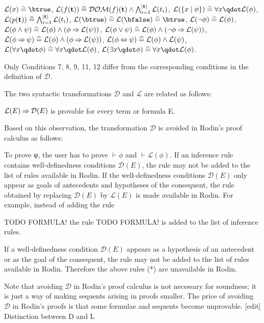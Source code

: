     $\mathcal{L}(x)\defi \btrue$,
    $\mathcal{L}(f(\mathbf{t}))\mathrel{\widehat=} \mathcal{DOM}(f)(\mathbf{t}) \land \bigwedge_{i=1}^{|\mathbf{t}|} \mathcal{L}(t_i)$,
    $\mathcal{L}(\{x\mid \phi\})\defi \forall x\qdot \mathcal{L}(\phi)$,
    $\mathcal{L}(p(\mathbf{t}))\mathrel{\widehat=} \bigwedge_{i=1}^{|\mathbf{t}|} \mathcal{L}(t_i)$,
    $\mathcal{L}(\btrue) \defi \mathcal{L}(\bfalse) \defi \btrue$,
    $\mathcal{L}(\lnot\phi) \mathrel{\widehat=} \mathcal{L}(\phi)$,
    $\mathcal{L}(\phi\land\psi)\mathrel{\widehat=} \mathcal{L}(\phi) \land (\phi \mathbin\Rightarrow \mathcal{L}(\psi))$,
    $\mathcal{L}(\phi\lor\psi)\mathrel{\widehat=} \mathcal{L}(\phi) \land (\lnot\phi \mathbin\Rightarrow \mathcal{L}(\psi))$,
    $\mathcal{L}(\phi\mathbin\Rightarrow\psi)\mathrel{\widehat=} \mathcal{L}(\phi) \land (\phi \mathbin\Rightarrow \mathcal{L}(\psi))$,
    $\mathcal{L}(\phi\mathbin\Leftrightarrow\psi)\mathrel{\widehat=} \mathcal{L}(\phi) \land \mathcal{L}(\psi)$,
    $\mathcal{L}(\forall x\qdot \phi)\defi \forall x\qdot \mathcal{L}(\phi)$,
    $\mathcal{L}(\exists x\qdot \phi)\defi \forall x\qdot \mathcal{L}(\phi)$. 

Only Conditions 7, 8, 9, 11, 12 differ from the corresponding conditions in the definition of $\mathcal{D}$.

The two syntactic transformations $\mathcal{D}$ and $\mathcal{L}$ are related as follows:

    $\mathcal{L}(E) \mathbin\Rightarrow \mathcal{D}(E)$ is provable for every term or formula E.

Based on this observation, the transformation $\mathcal{D}$ is avoided in Rodin's proof calculus as follows:

    To prove φ, the user has to prove $\vdash\phi$ and $\vdash\mathcal{L}(\phi)$.
    If an inference rule contains well-definedness conditions $\mathcal{D}(E)$, the rule may not be added to the list of rules available in Rodin.
        If the well-definedness conditions $\mathcal{D}(E)$ only appear as goals of antecedents and hypotheses of the consequent, the rule obtained by replacing $\mathcal{D}(E)$ by $\mathcal{L}(E)$ is made available in Rodin. For example, instead of adding the rule

        TODO FORMULA!
        the rule 
        TODO FORMULA!
        is added to the list of inference rules. 

        If a well-definedness condition $\mathcal{D}(E)$ appears as a hypothesis of an antecedent or as the goal of the consequent, the rule may not be added to the list of rules available in Rodin. Therefore the above rules (*) are unavailable in Rodin. 

Note that avoiding $\mathcal{D}$ in Rodin's proof calculus is not necessary for soundness; it is just a way of making sequents arising in proofs smaller. The price of avoiding $\mathcal{D}$ in Rodin's proofs is that some formulae and sequents become unprovable.
[edit] Distinction between D and L


